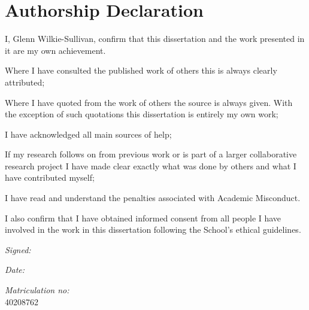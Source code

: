 
\section*{Authorship Declaration}
\vspace{0.5cm}
\begin{flushleft}
I, Glenn Wilkie-Sullivan, confirm that this dissertation and the work presented in it are my own achievement.\newline

Where I have consulted the published work of others this is always clearly attributed;\newline

Where I have quoted from the work of others the source is always given. With the exception of such quotations this dissertation is entirely my own work;\newline

I have acknowledged all main sources of help; \newline

If my research follows on from previous work or is part of a larger collaborative research project I have made clear exactly what was done by others and what I have contributed myself;\newline

I have read and understand the penalties associated with Academic Misconduct.\newline

I also confirm that I have obtained informed consent from all people I have involved in the work in this dissertation following the School's ethical guidelines.\newline
\end{flushleft}

\begin{flushleft} \large
\emph{Signed:} \\
\end{flushleft}

\vspace{.5cm}

\begin{flushleft} \large
\emph{Date:} \\
\end{flushleft}

\vspace{.5cm}

\begin{flushleft} \large
\emph{Matriculation no: }  \\ 40208762
\end{flushleft}